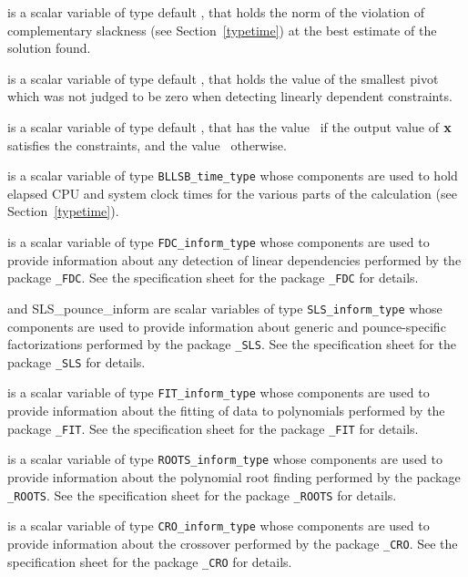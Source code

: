 \documentclass{galahad}
\newcommand{\packagename}{BLLSB}
\begin{document}
\begin{description}
is a scalar variable of type default \realdp,
that holds the norm of the violation of complementary slackness
(see Section~\ref{typetime}) at the best estimate of the solution found.

is a scalar variable of type default \realdp,
that holds the value of the smallest pivot which was not judged to be 
zero when detecting linearly dependent constraints.

 is a scalar variable of type default \logical, that has the
value \true\ if the output value of ${\mathbf{x}}$ satisfies the constraints,
and the value \false\ otherwise.

 is a scalar variable of type {\tt \packagename\_time\_type}
whose components are used to hold elapsed CPU and system clock times for the
various parts of the calculation (see Section~\ref{typetime}).

 is a scalar variable of type
{\tt FDC\_inform\_type}
whose components are used to provide information about
any detection of linear dependencies
performed by the package
{\tt \libraryname\_FDC}.
See the specification sheet for the package
{\tt \libraryname\_FDC} for details.

 and {SLS\_pounce\_inform}
are scalar variables of type {\tt SLS\_inform\_type}
whose components are used to provide information about
generic and pounce-specific factorizations performed by the package
{\tt \libraryname\_SLS}.
See the specification sheet for the package
{\tt \libraryname\_SLS} for details.

 is a scalar variable of type
{\tt FIT\_inform\_type}
whose components are used to provide information about the fitting
of data to polynomials performed by the package
{\tt \libraryname\_FIT}.
See the specification sheet for the package
{\tt \libraryname\_FIT} for details.

 is a scalar variable of type
{\tt ROOTS\_inform\_type}
whose components are used to provide information about the
polynomial root finding performed by the package
{\tt \libraryname\_ROOTS}.
See the specification sheet for the package
{\tt \libraryname\_ROOTS} for details.

 is a scalar variable of type
{\tt CRO\_inform\_type}
whose components are used to provide information about the crossover
performed by the package
{\tt \libraryname\_CRO}.
See the specification sheet for the package
{\tt \libraryname\_CRO} for details.

\end{description}
\end{document}
